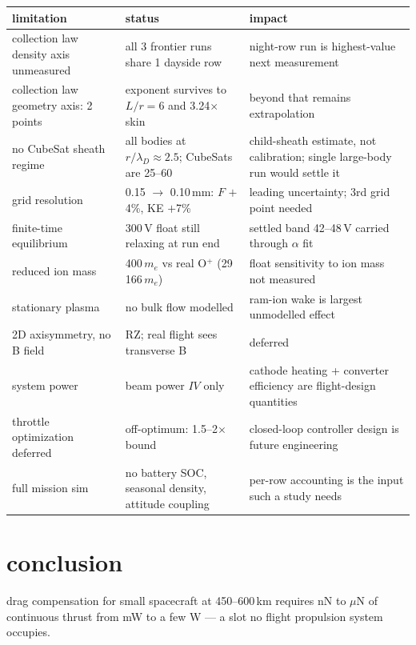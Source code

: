 \documentclass[11pt]{article}
\begin{document}
\begin{center}\small
\begin{tabular}{p{4cm}p{4.5cm}p{4.5cm}}
\toprule
limitation & status & impact \\
\midrule
collection law density axis unmeasured & all 3 frontier runs share 1 dayside
  row & night-row run is highest-value next measurement \\
collection law geometry axis: 2 points & exponent survives to $L/r = 6$ and
  3.24$\times$ skin & beyond that remains extrapolation \\
no CubeSat sheath regime & all bodies at $r/\lambda_D \approx 2.5$; CubeSats
  are 25--60 & child-sheath estimate, not calibration; single large-body run
  would settle it \\
grid resolution & 0.15 $\to$ 0.10\,mm: $F$ $+$4\%, KE $+$7\% &
  leading uncertainty; 3rd grid point needed \\
finite-time equilibrium & 300\,V float still relaxing at run end &
  settled band 42--48\,V carried through $\alpha$ fit \\
reduced ion mass & 400\,$m_e$ vs real O$^+$ (29\,166\,$m_e$) &
  float sensitivity to ion mass not measured \\
stationary plasma & no bulk flow modelled & ram-ion wake is largest
  unmodelled effect \\
2D axisymmetry, no B field & RZ; real flight sees transverse B & deferred \\
system power & beam power $IV$ only & cathode heating + converter efficiency
  are flight-design quantities \\
throttle optimization deferred & off-optimum: 1.5--2$\times$ bound &
  closed-loop controller design is future engineering \\
full mission sim & no battery SOC, seasonal density, attitude coupling &
  per-row accounting is the input such a study needs \\
\bottomrule
\end{tabular}
\end{center}

\section{conclusion}

drag compensation for small spacecraft at 450--600\,km requires nN to $\mu$N
of continuous thrust from mW to a few W --- a slot no flight propulsion system
occupies.
\end{document}
